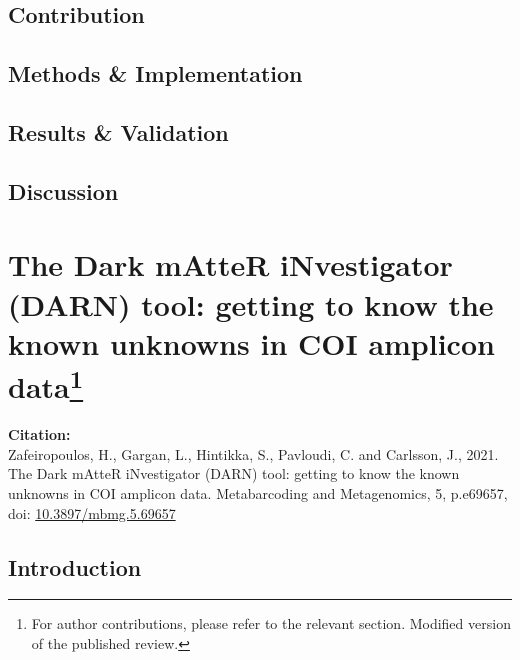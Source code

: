    \subsection{Contribution}


   \subsection{Methods \& Implementation}

   \subsection{Results \& Validation}


   \subsection{Discussion}



\newpage



% 
% 

\newpage

\section[The Dark mAtteR iNvestigator (DARN) tool: getting to know the known unknowns in COI amplicon data]{The Dark mAtteR iNvestigator (DARN) tool: getting to know the known unknowns in COI amplicon data\footnote{For author contributions, please refer to the relevant section. Modified version of the published review.}}

\textbf{Citation:} \\
Zafeiropoulos, H., Gargan, L., Hintikka, S., Pavloudi, C. and Carlsson, J., 2021. The Dark mAtteR iNvestigator (DARN) tool: getting to know the known unknowns in COI amplicon data. Metabarcoding and Metagenomics, 5, p.e69657, \\
doi: \href{https://doi.org/10.3897/mbmg.5.69657}{10.3897/mbmg.5.69657}

\subsection{Introduction}



